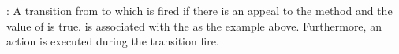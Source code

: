 \noindent
{}

: A transition from  to  which is fired if there is an appeal to the method  and the value of  is true.
 is associated with the  as the example above.
Furthermore, an action  is executed during the transition fire.